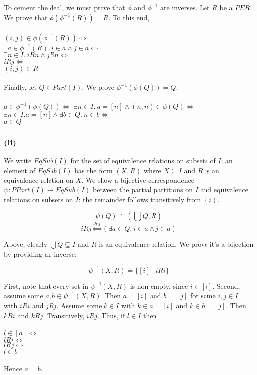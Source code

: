 \documentclass{article}
\begin{document}
To cement the deal, we must prove that $\phi$ and $\phi^{-1}$ are inverses.
Let $R$ be a $PER$. We prove that $\phi(\phi^{-1}(R)) = R$. To this end,\\~\\
$(i,j) \in \phi(\phi^{-1}(R)) \Leftrightarrow$\\
$\exists a \in \phi^{-1}(R).~i \in a \wedge j \in a \Leftrightarrow$\\
$\exists n \in I.~iRn \wedge jRn \Leftrightarrow$\\
$iRj \Leftrightarrow$\\
$(i,j) \in R$\\~\\

Finally, let $Q \in Part(I)$. We prove $\phi^{-1}(\phi(Q)) = Q$.\\~\\
$a \in \phi^{-1}(\phi(Q)) \Leftrightarrow$
$\exists n \in I.~a = [n] \wedge (n,n) \in \phi(Q) \Leftrightarrow$\\
$\exists n \in I. a = [n] \wedge \exists b \in Q.~n \in b \Leftrightarrow$\\
$a \in Q$



\subsubsection*{(ii)}

We write $EqSub(I)$ for the set of equivalence relations on subsets of $I$; an element of $EqSub(I)$ has the form
$(X, R)$ where $X \subseteq I$ and $R$ is an equivalence relation on $X$. 
We show a bijective correspondence $\psi : PPart(I) \to EqSub(I)$ between the partial partitions on $I$ and 
equivalence relations on subsets on $I$: the remainder follows transitively from $(i)$.

$$\psi(Q) \doteq (\bigcup Q, R)$$
$$iRj \overset{def}{\Leftrightarrow} (\exists a \in Q.~i \in a \wedge j \in a)$$

Above, clearly $\bigcup Q \subseteq I$ and $R$ is an equivalence relation.
We prove it's a bijection by providing an inverse:

$$\psi^{-1}(X,R) \doteq \{ [i] \mid iRi \}$$
 
First, note that every set in $\psi^{-1}(X,R)$ is non-empty, since $i \in [i]$.
Second, assume some $a,b \in \psi^{-1}(X,R)$. Then $a = [i]$ and $b = [j]$ for some $i,j \in I$ with $iRi$ and $jRj$.
Assume some $k \in I$ with $k \in a = [i]$ and $k \in b = [j]$. Then $kRi$ and $kRj$. Transitively, $iRj$. 
Thus, if $l \in I$ then\\~\\
$l \in [a] \Leftrightarrow$\\
$lRi \Leftrightarrow$\\
$lRj \Leftrightarrow$\\
$l \in b$\\~\\
Hence $a = b$.
\end{document}
